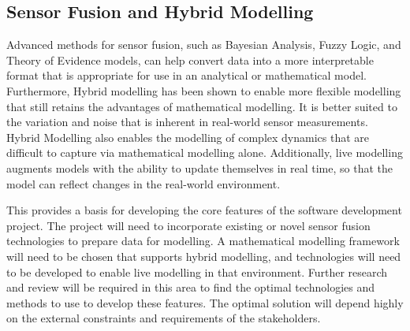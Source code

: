 \subsection{Sensor Fusion and Hybrid Modelling}

Advanced methods for sensor fusion, such as Bayesian Analysis, Fuzzy Logic, and Theory of Evidence models, can help convert data into a more interpretable format that is appropriate for use in an analytical or mathematical model. 
Furthermore, Hybrid modelling has been shown to enable more flexible modelling that still retains the advantages of mathematical modelling. 
It is better suited to the variation and noise that is inherent in real-world sensor measurements. 
Hybrid Modelling also enables the modelling of complex dynamics that are difficult to capture via mathematical modelling alone. 
Additionally, live modelling augments models with the ability to update themselves in real time, so that the model can reflect changes in the real-world environment.


This provides a basis for developing the core features of the software development project. The project will need to incorporate existing or novel sensor fusion technologies to prepare data for modelling. 
A mathematical modelling framework will need to be chosen that supports hybrid modelling, and technologies will need to be developed to enable live modelling in that environment. 
Further research and review will be required in this area to find the optimal technologies and methods to use to develop these features. The optimal solution will depend highly on the external constraints and requirements of the stakeholders.

